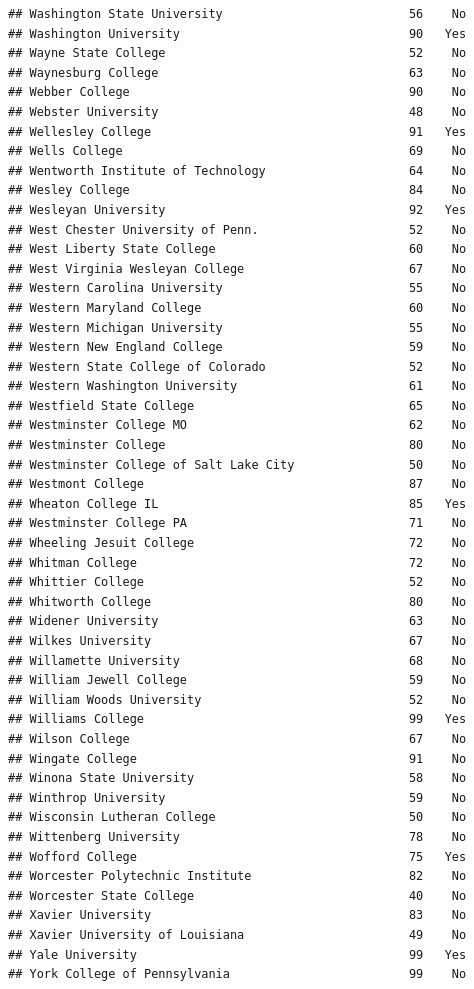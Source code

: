 \documentclass[
]{article}
\begin{document}
\begin{verbatim}
## Washington State University                          56    No
## Washington University                                90   Yes
## Wayne State College                                  52    No
## Waynesburg College                                   63    No
## Webber College                                       90    No
## Webster University                                   48    No
## Wellesley College                                    91   Yes
## Wells College                                        69    No
## Wentworth Institute of Technology                    64    No
## Wesley College                                       84    No
## Wesleyan University                                  92   Yes
## West Chester University of Penn.                     52    No
## West Liberty State College                           60    No
## West Virginia Wesleyan College                       67    No
## Western Carolina University                          55    No
## Western Maryland College                             60    No
## Western Michigan University                          55    No
## Western New England College                          59    No
## Western State College of Colorado                    52    No
## Western Washington University                        61    No
## Westfield State College                              65    No
## Westminster College MO                               62    No
## Westminster College                                  80    No
## Westminster College of Salt Lake City                50    No
## Westmont College                                     87    No
## Wheaton College IL                                   85   Yes
## Westminster College PA                               71    No
## Wheeling Jesuit College                              72    No
## Whitman College                                      72    No
## Whittier College                                     52    No
## Whitworth College                                    80    No
## Widener University                                   63    No
## Wilkes University                                    67    No
## Willamette University                                68    No
## William Jewell College                               59    No
## William Woods University                             52    No
## Williams College                                     99   Yes
## Wilson College                                       67    No
## Wingate College                                      91    No
## Winona State University                              58    No
## Winthrop University                                  59    No
## Wisconsin Lutheran College                           50    No
## Wittenberg University                                78    No
## Wofford College                                      75   Yes
## Worcester Polytechnic Institute                      82    No
## Worcester State College                              40    No
## Xavier University                                    83    No
## Xavier University of Louisiana                       49    No
## Yale University                                      99   Yes
## York College of Pennsylvania                         99    No
\end{verbatim}
\end{document}
